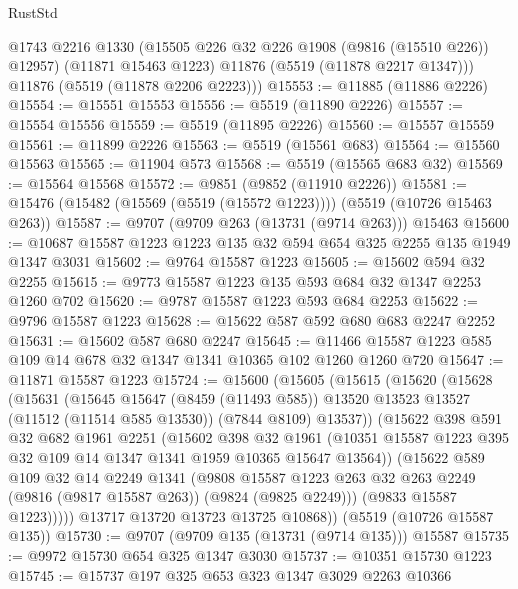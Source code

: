 \begin{lexlean}{RustStd}
\begin{coremodule}
        @1743
        @2216
        @1330
        (@15505 @226 @32 @226 @1908 (@9816 (@15510 @226)) @12957)
        (@11871 @15463 @1223)
        @11876
        (@5519 (@11878 @2217 @1347)))
      @11876
      (@5519 (@11878 @2206 @2223)))
@15553 := @11885 (@11886 @2226)
@15554 := @15551 @15553
@15556 := @5519 (@11890 @2226)
@15557 := @15554 @15556
@15559 := @5519 (@11895 @2226)
@15560 := @15557 @15559
@15561 := @11899 @2226
@15563 := @5519 (@15561 @683)
@15564 := @15560 @15563
@15565 := @11904 @573
@15568 := @5519 (@15565 @683 @32)
@15569 := @15564 @15568
@15572 := @9851 (@9852 (@11910 @2226))
@15581 := @15476 (@15482 (@15569 (@5519 (@15572 @1223)))) (@5519 (@10726 @15463 @263))
@15587 := @9707 (@9709 @263 (@13731 (@9714 @263))) @15463
@15600 := @10687 @15587 @1223 @1223 @135 @32 @594 @654 @325 @2255 @135 @1949 @1347 @3031
@15602 := @9764 @15587 @1223
@15605 := @15602 @594 @32 @2255
@15615 := @9773 @15587 @1223 @135 @593 @684 @32 @1347 @2253 @1260 @702
@15620 := @9787 @15587 @1223 @593 @684 @2253
@15622 := @9796 @15587 @1223
@15628 := @15622 @587 @592 @680 @683 @2247 @2252
@15631 := @15602 @587 @680 @2247
@15645 := @11466 @15587 @1223 @585 @109 @14 @678 @32 @1347 @1341 @10365 @102 @1260 @1260 @720
@15647 := @11871 @15587 @1223
@15724 := @15600
    (@15605
      (@15615
        (@15620
          (@15628
            (@15631
              (@15645
                @15647
                (@8459 (@11493 @585))
                @13520
                @13523
                @13527
                (@11512 (@11514 @585 @13530))
                (@7844 @8109)
                @13537))
            (@15622
              @398
              @591
              @32
              @682
              @1961
              @2251
              (@15602
                @398
                @32
                @1961
                (@10351 @15587 @1223 @395 @32 @109 @14 @1347 @1341 @1959 @10365 @15647 @13564))
              (@15622
                @589
                @109
                @32
                @14
                @2249
                @1341
                (@9808
                  @15587
                  @1223
                  @263
                  @32
                  @263
                  @2249
                  (@9816 (@9817 @15587 @263))
                  (@9824 (@9825 @2249)))
                (@9833 @15587 @1223)))))
        @13717
        @13720
        @13723
        @13725
        @10868))
    (@5519 (@10726 @15587 @135))
@15730 := @9707 (@9709 @135 (@13731 (@9714 @135))) @15587
@15735 := @9972 @15730 @654 @325 @1347 @3030
@15737 := @10351 @15730 @1223
@15745 := @15737 @197 @325 @653 @323 @1347 @3029 @2263 @10366

\end{coremodule}
\end{lexlean}
